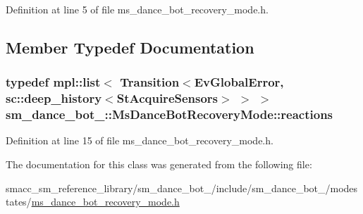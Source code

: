 Definition at line 5 of file ms\+\_\+dance\+\_\+bot\+\_\+recovery\+\_\+mode.\+h.



\subsection{Member Typedef Documentation}
\subsubsection[{\texorpdfstring{reactions}{reactions}}]{\setlength{\rightskip}{0pt plus 5cm}typedef mpl\+::list$<$ Transition$<${\bf Ev\+Global\+Error}, sc\+::deep\+\_\+history$<${\bf St\+Acquire\+Sensors}$>$ $>$ $>$ {\bf sm\+\_\+dance\+\_\+bot\+\_\+::\+Ms\+Dance\+Bot\+Recovery\+Mode\+::reactions}}\hypertarget{classsm__dance__bot__3_1_1MsDanceBotRecoveryMode_a4e5bd5d1e67102d83d8c0feed79d4c51}{}\label{classsm__dance__bot__3_1_1MsDanceBotRecoveryMode_a4e5bd5d1e67102d83d8c0feed79d4c51}


Definition at line 15 of file ms\+\_\+dance\+\_\+bot\+\_\+recovery\+\_\+mode.\+h.



The documentation for this class was generated from the following file\+:\begin{DoxyCompactItemize}
\item 
smacc\+\_\+sm\+\_\+reference\+\_\+library/sm\+\_\+dance\+\_\+bot\+\_/include/sm\+\_\+dance\+\_\+bot\+\_/modestates/\hyperlink{3_2include_2sm__dance__bot__3_2modestates_2ms__dance__bot__recovery__mode_8h}{ms\+\_\+dance\+\_\+bot\+\_\+recovery\+\_\+mode.\+h}\end{DoxyCompactItemize}
